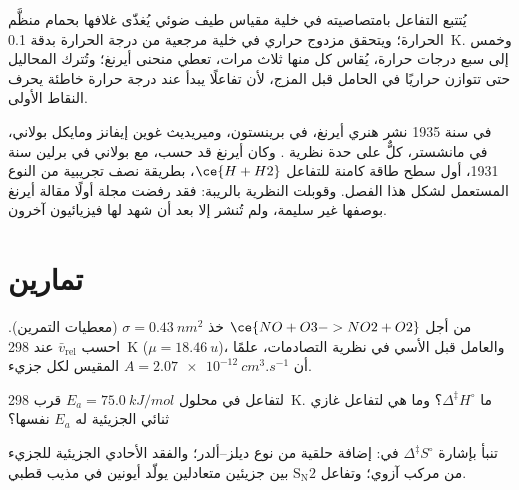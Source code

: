 \begin{inthelab}
يُتتبع التفاعل بامتصاصيته في خلية مقياس طيف ضوئي يُغذّى
غلافها بحمام منظَّم الحرارة؛ ويتحقق مزدوج حراري في خلية مرجعية من
درجة الحرارة بدقة \qty{0.1}{K}. وخمس إلى سبع درجات حرارة، يُقاس كل منها
ثلاث مرات، تعطي منحنى أيرنغ؛ وتُترك المحاليل حتى تتوازن حراريًا في
الحامل قبل المزج، لأن تفاعلًا يبدأ عند درجة حرارة خاطئة يحرف
النقاط الأولى.
\end{inthelab}

\begin{history}
في سنة 1935 نشر هنري أيرنغ، في برينستون، وميريديث غوين إيفانز ومايكل
بولاني، في مانشستر، كلٌّ على حدة نظرية . وكان أيرنغ قد حسب، مع بولاني في برلين سنة 1931، أول
سطح طاقة كامنة للتفاعل $\ce{H + H2}$، بطريقة نصف تجريبية من النوع المستعمل
لشكل هذا الفصل. وقوبلت النظرية بالريبة: فقد رفضت
مجلة أولًا مقالة أيرنغ بوصفها غير سليمة، ولم تُنشر إلا
بعد أن شهد لها فيزيائيون آخرون.
\end{history}

\section{تمارين}

\begin{exercise}[$\star$]\label{exo:b3:rate-theories:1}
من أجل $\ce{NO + O3 -> NO2 + O2}$ خذ $\sigma = \qty{0.43}{nm^2}$ (معطيات التمرين). احسب $\bar v_{\mathrm{rel}}$
عند \qty{298}{K} ($\mu = \qty{18.46}{u}$)، والعامل قبل الأسي في نظرية التصادمات، 
 علمًا أن $A = \qty{2.07e-12}{cm^3.s^{-1}}$ المقيس لكل جزيء.
\end{exercise}

\begin{exercise}[$\star$]\label{exo:b3:rate-theories:2}
لتفاعل في محلول $E_a = \qty{75.0}{kJ/mol}$ قرب \qty{298}{K}. ما $\Delta^{\ddagger}H^\circ$؟ وما هي
لتفاعل غازي ثنائي الجزيئية له $E_a$ نفسها؟
\end{exercise}

\begin{exercise}[$\star$]\label{exo:b3:rate-theories:3}
تنبأ بإشارة $\Delta^{\ddagger}S^\circ$ في: إضافة حلقية من نوع ديلز--ألدر؛ 
والفقد الأحادي الجزيئية للجزيء  من مركب آزوي؛ وتفاعل $\mathrm{S_N2}$ بين جزيئين
متعادلين يولّد أيونين في مذيب قطبي.
\end{exercise}

